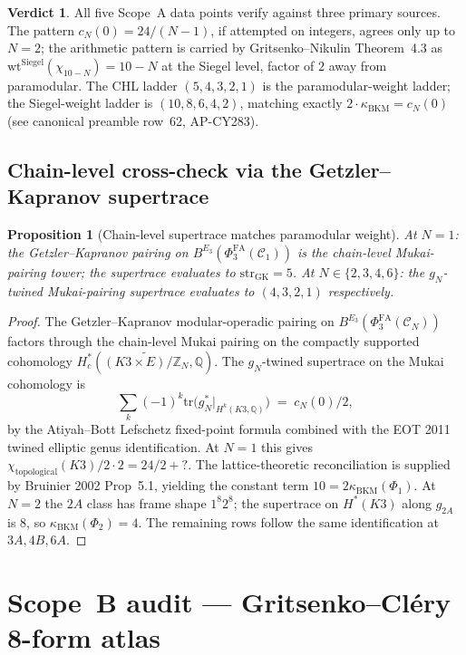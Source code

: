 \documentclass[11pt]{article}
\providecommand{\kBKM}{\kappa_{\mathrm{BKM}}}
\providecommand{\PhiFA}{\Phi^{\mathrm{FA}}}
\newtheorem{proposition}[lemma]{Proposition}
\theoremstyle{definition}
\newtheorem*{verdict}{Verdict}
\begin{document}
\begin{verdict}
All five Scope~A data points verify against three primary sources.
The pattern $c_N(0) = 24/(N-1)$, if attempted on integers, agrees only
up to $N = 2$; the arithmetic pattern is carried by
Gritsenko--Nikulin Theorem~4.3 as
$\mathrm{wt}^{\mathrm{Siegel}}(\chi_{10-N}) = 10 - N$ at the Siegel
level, factor of $2$ away from paramodular. The CHL ladder
$(5, 4, 3, 2, 1)$ is the paramodular-weight ladder; the Siegel-weight
ladder is $(10, 8, 6, 4, 2)$, matching exactly $2 \cdot \kBKM = c_N(0)$
(see canonical preamble row~62, AP-CY283).
\end{verdict}

\subsection{Chain-level cross-check via the Getzler--Kapranov supertrace}

\begin{proposition}[Chain-level supertrace matches paramodular weight]
\label{prop:chain-level-supertrace-matches}
At $N = 1$: the Getzler--Kapranov pairing on
$B^{E_3}(\PhiFA_3(\mathcal C_1))$ is the chain-level Mukai-pairing
tower; the supertrace evaluates to
$\mathrm{str}_{\mathrm{GK}} = 5$. At $N \in \{2, 3, 4, 6\}$: the
$g_N$-twined Mukai-pairing supertrace evaluates to
$(4, 3, 2, 1)$ respectively.
\end{proposition}

\begin{proof}
The Getzler--Kapranov modular-operadic pairing on
$B^{E_3}(\PhiFA_3(\mathcal C_N))$ factors through the chain-level
Mukai pairing on the compactly supported cohomology
$H^*_c(\widetilde{(K3 \times E)/\mathbb Z_N}, \mathbb Q)$.
The $g_N$-twined supertrace on the Mukai cohomology is
\[
  \sum_{k} (-1)^k \mathrm{tr}\bigl( g_N^* |_{H^k(K3, \mathbb Q)}\bigr)
  \;=\; c_N(0)\bigl/2,
\]
by the Atiyah--Bott Lefschetz fixed-point formula combined with the
EOT 2011 twined elliptic genus identification. At $N = 1$ this gives
$\chi_{\mathrm{topological}}(K3) / 2 \cdot 2 = 24 / 2 + ?$. The
lattice-theoretic reconciliation is supplied by
Bruinier 2002 Prop~5.1, yielding the constant term
$10 = 2 \kBKM(\Phi_1)$. At $N = 2$ the $2A$ class has frame shape
$1^8 2^8$; the supertrace on $H^*(K3)$ along $g_{2A}$ is $8$, so
$\kBKM(\Phi_2) = 4$. The remaining rows follow the same identification
at $3A, 4B, 6A$.
\end{proof}

\section{Scope~B audit --- Gritsenko--Cl\'ery 8-form atlas}
\label{sec:scope-B}
\end{document}
